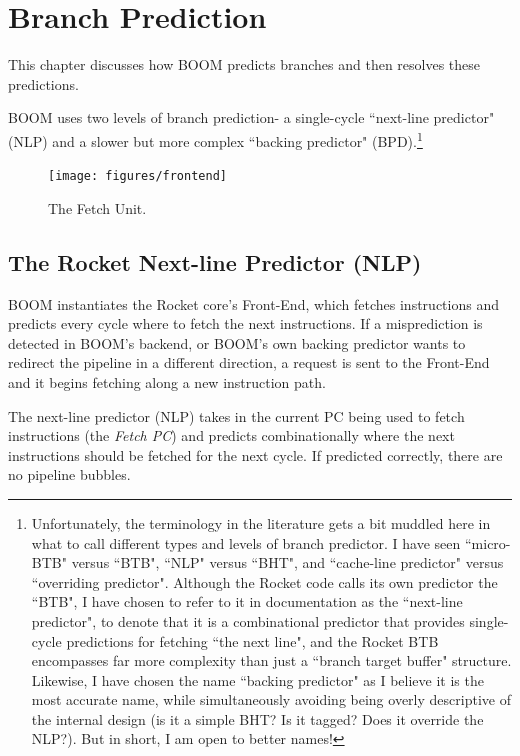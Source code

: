  
\chapter{Branch Prediction}\label{chapter:bpd}

This chapter discusses how BOOM predicts branches and then resolves these predictions.

BOOM uses two levels of branch prediction- a single-cycle ``next-line predictor" (NLP) and a slower but more complex ``backing predictor" (BPD).\footnote{Unfortunately, the terminology in the literature gets a bit muddled here in what to call different types and levels of branch predictor. I have seen ``micro-BTB" versus ``BTB", ``NLP" versus ``BHT", and ``cache-line predictor" versus ``overriding predictor". 
Although the Rocket code calls its own predictor the ``BTB", I have chosen to refer to it in documentation as the ``next-line predictor", to denote that it is a combinational predictor that provides single-cycle predictions for fetching ``the next line", and the Rocket BTB encompasses far more complexity than just a ``branch target buffer" structure.  Likewise, I have chosen the name ``backing predictor" as I believe it is the most accurate name, while simultaneously avoiding being overly descriptive of the internal design (is it a simple BHT? Is it tagged? Does it override the NLP?).
{\color{red} But in short, I am open to better names!}}



\begin{figure}[ht]
	\centering
	\centerline{\texttt{[image: figures/frontend]}}
	\caption{ \small The Fetch Unit.}
	\label{fig:fetch}
\end{figure}


\section{The Rocket Next-line Predictor (NLP)}

BOOM instantiates the Rocket core's Front-End, which fetches instructions and predicts every cycle where to fetch the next instructions. If a misprediction is detected in BOOM's backend, or BOOM's own backing predictor wants to redirect the pipeline in a different direction, a request is sent to the Front-End and it begins fetching along a new instruction path. 

The next-line predictor (NLP) takes in the current PC being used to fetch instructions (the {\em Fetch PC}) and predicts combinationally where the next instructions should be fetched for the next cycle. If predicted correctly, there are no pipeline bubbles. 

